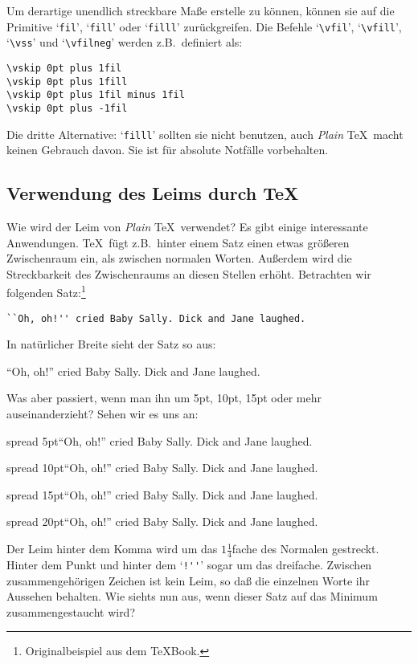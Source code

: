 Um derartige unendlich streckbare 
Ma\ss{}e erstelle zu k\"onnen, k\"onnen sie
auf die 
Primitive `\verb|fil|', `\verb|fill|' oder `\verb|filll|'
zur\"uckgreifen. Die Befehle `\verb|\vfil|', `\verb|\vfill|',
`\verb|\vss|' und `\verb|\vfilneg|' werden z.B.\ definiert als:
\begin{verbatim}
\vskip 0pt plus 1fil
\vskip 0pt plus 1fill
\vskip 0pt plus 1fil minus 1fil
\vskip 0pt plus -1fil
\end{verbatim}
Die dritte Alternative: `\verb|filll|' sollten sie nicht benutzen,
auch {\em Plain} \TeX\ macht keinen Gebrauch davon. Sie ist f\"ur absolute
Notf\"alle vorbehalten.
\subsection{Verwendung des Leims durch \TeX}
Wie wird der Leim von {\em Plain} \TeX\ verwendet? Es gibt einige
interessante Anwendungen. \TeX\ f\"ugt z.B.\ hinter einem Satz einen
etwas 
gr\"o\ss{}eren Zwischenraum ein, als zwischen normalen Worten.
Au\ss{}erdem wird die Streckbarkeit des Zwischenraums an diesen Stellen
erh\"oht. Betrachten wir folgenden Satz:\footnote{Originalbeispiel aus
dem \TeX Book.}
\begin{verbatim}
``Oh, oh!'' cried Baby Sally. Dick and Jane laughed.
\end{verbatim}
In nat\"urlicher Breite sieht der Satz so aus:\medskip

``Oh, oh!'' cried Baby Sally. Dick and Jane laughed.\medskip

Was aber passiert, wenn man ihn um 5pt, 10pt, 15pt oder mehr
auseinanderzieht? Sehen wir es uns an:\medskip

\hbox spread 5pt{``Oh, oh!'' cried Baby Sally. Dick and Jane laughed.}

\hbox spread 10pt{``Oh, oh!'' cried Baby Sally. Dick and Jane laughed.}

\hbox spread 15pt{``Oh, oh!'' cried Baby Sally. Dick and Jane laughed.}

\hbox spread 20pt{``Oh, oh!'' cried Baby Sally. Dick and Jane laughed.}\medskip

Der Leim hinter dem Komma wird um das $1\frac{1}{4}$fache des Normalen
gestreckt. Hinter dem 
Punkt und hinter dem `\verb|!''|' sogar um das
dreifache. Zwischen zusammengeh\"origen Zeichen ist kein Leim, so da\ss{}
die einzelnen Worte ihr Aussehen behalten. Wie siehts nun aus, wenn
dieser Satz auf das Minimum zusammengestaucht wird?\medskip

